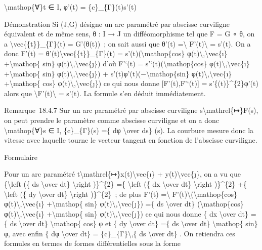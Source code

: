 \documentclass[]{article}
\begin{document}
\textbackslash{}mathop\{∀\}t ∈ I, φ'(t) = \{c\}\_\{Γ\}(t)s'(t)

Démonstration Si (J,G) désigne un arc paramétré par abscisse curviligne
équivalent et de même sens, θ : I → J un difféomorphisme tel que F = G ∘
θ, on a \textbackslash{}vec\{\{t\}\}\_\{Γ\}(t) = G'(θ(t))~; on sait
aussi que θ'(t) =\textbackslash{}\textbar{}
F'(t)\textbackslash{}\textbar{} = s'(t). On a donc F'(t) =
θ'(t)\textbackslash{}vec\{\{t\}\}\_\{Γ\}(t) =
s'(t)(\textbackslash{}mathop\{cos\}
φ(t)\textbackslash{},\textbackslash{}vec\{ı\} +\textbackslash{}mathop\{
sin\} φ(t)\textbackslash{},\textbackslash{}vec\{ȷ\}) d'où F'`(t) =
s'`(t)(\textbackslash{}mathop\{cos\}
φ(t)\textbackslash{},\textbackslash{}vec\{ı\} +\textbackslash{}mathop\{
sin\} φ(t)\textbackslash{},\textbackslash{}vec\{ȷ\}) +
s'(t)φ'(t)(−\textbackslash{}mathop\{sin\}
φ(t)\textbackslash{},\textbackslash{}vec\{ı\} +\textbackslash{}mathop\{
cos\} φ(t)\textbackslash{},\textbackslash{}vec\{ȷ\}) ce qui nous donne
{[}F'(t),F'`(t){]} = s'\{(t)\}\^{}\{2\}φ'(t) alors que
\textbackslash{}\textbar{}F'(t)\textbackslash{}\textbar{} = s'(t). La
formule s'en déduit immédiatement.

Remarque~18.4.7 Sur un arc paramétré par abscisse curviligne
s\textbackslash{}mathrel\{↦\}F(s), on peut prendre le paramètre comme
abscisse curviligne et on a donc \textbackslash{}mathop\{∀\}s ∈ I,
\{c\}\_\{Γ\}(s) =\{ dφ \textbackslash{}over ds\} (s). La courbure mesure
donc la vitesse avec laquelle tourne le vecteur tangent en fonction de
l'abscisse curviligne.

Formulaire

Pour un arc paramétré
t\textbackslash{}mathrel\{↦\}x(t)\textbackslash{}vec\{ı\} +
y(t)\textbackslash{}vec\{ȷ\}, on a vu que \{\textbackslash{}left (\{ ds
\textbackslash{}over dt\} \textbackslash{}right )\}\^{}\{2\} =\{
\textbackslash{}left (\{ dx \textbackslash{}over dt\}
\textbackslash{}right )\}\^{}\{2\} +\{ \textbackslash{}left (\{ dy
\textbackslash{}over dt\} \textbackslash{}right )\}\^{}\{2\}~; de plus
F'(t) =\textbackslash{}\textbar{}
F'(t)\textbackslash{}\textbar{}(\textbackslash{}mathop\{cos\}
φ(t)\textbackslash{},\textbackslash{}vec\{ı\} +\textbackslash{}mathop\{
sin\} φ(t)\textbackslash{},\textbackslash{}vec\{ȷ\}) =\{ ds
\textbackslash{}over dt\} (\textbackslash{}mathop\{cos\}
φ(t)\textbackslash{},\textbackslash{}vec\{ı\} +\textbackslash{}mathop\{
sin\} φ(t)\textbackslash{},\textbackslash{}vec\{ȷ\}) ce qui nous donne
\{ dx \textbackslash{}over dt\} =\{ ds \textbackslash{}over dt\}
\textbackslash{}mathop\{ cos\} φ et \{ dy \textbackslash{}over dt\} =\{
ds \textbackslash{}over dt\} \textbackslash{}mathop\{ sin\} φ, avec
enfin \{ dφ \textbackslash{}over dt\} = \{c\}\_\{Γ\}\textbackslash{},\{
ds \textbackslash{}over dt\} . On retiendra ces formules en termes de
formes différentielles sous la forme
\end{document}
